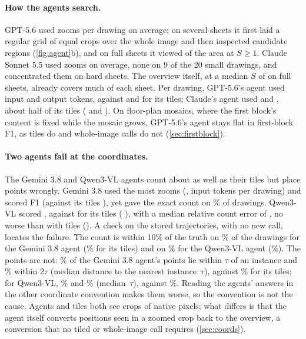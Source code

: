 \paragraph{How the agents search.} GPT-5.6 used \XagZoomsgptFiveSix{} zooms per drawing on average; on several sheets it first laid a regular grid of equal crops over the whole image and then inspected candidate regions (\cref{fig:agent}b), and on full sheets it viewed \XagCovSheetsgptFiveSix{} of the area at $S \ge 1$. Claude Sonnet 5.5 used \XagZoomssonnetFiveFive{} zooms on average, none on 9 of the 20 small drawings, and concentrated them on hard sheets. The overview itself, at a median $S$ of \XovSmedSheets{} on full sheets, already covers much of each sheet. Per drawing, GPT-5.6's agent used \XagTokIngptFiveSix{} input and \XagTokOutgptFiveSix{} output tokens, against \XtileTokIngptFiveSix{} and \XtileTokOutgptFiveSix{} for its tiles; Claude's agent used \XagTokInsonnetFiveFive{} and \XagTokOutsonnetFiveFive, about half of its tiles (\XtileTokInsonnetFiveFive{} and \XtileTokOutsonnetFiveFive). On floor-plan mosaics, where the first block's content is fixed while the mosaic grows, GPT-5.6's agent stays flat in first-block F1, as tiles do and whole-image calls do not (\cref{sec:firstblock}).

\paragraph{Two agents fail at the coordinates.} The Gemini 3.8 and Qwen3-VL agents count about as well as their tiles but place points wrongly. Gemini 3.8 used the most zooms (\XagZoomsgemThreeEight, \XagTokIngemThreeEight{} input tokens per drawing) and scored \XagFgemThreeEightAll{} F1 (against its tiles \XagMinusDgemThreeEight{} \XagMinusDCIgemThreeEight), yet gave the exact count on \XagExactCountgemThreeEight\% of drawings. Qwen3-VL scored \XqAgF, against \XqD{} for its tiles (\XqAgMinusD{} \XqAgMinusDCI), with a median relative count error of \XqCountErrAg, no worse than with tiles (\XqCountErrD). A check on the stored trajectories, with no new call, locates the failure. The count is within 10\% of the truth on \CagCntGem\% of the drawings for the Gemini 3.8 agent (\CtileCntGem\% for its tiles) and on \CagCntQwen\% for the Qwen3-VL agent (\CtileCntQwen\%). The points are not: \CagLocGem\% of the Gemini 3.8 agent's points lie within $\tau$ of an instance and \CagLocGemTwo\% within $2\tau$ (median distance to the nearest instance \CagDistGem$\,\tau$), against \CtileLocGem\% for its tiles; for Qwen3-VL, \CagLocQwen\% and \CagLocQwenTwo\% (median \CagDistQwen$\,\tau$), against \CtileLocQwen\%. Reading the agents' answers in the other coordinate convention makes them worse, so the convention is not the cause. Agents and tiles both see crops of native pixels; what differs is that the agent itself converts positions seen in a zoomed crop back to the overview, a conversion that no tiled or whole-image call requires (\cref{sec:coords}).
